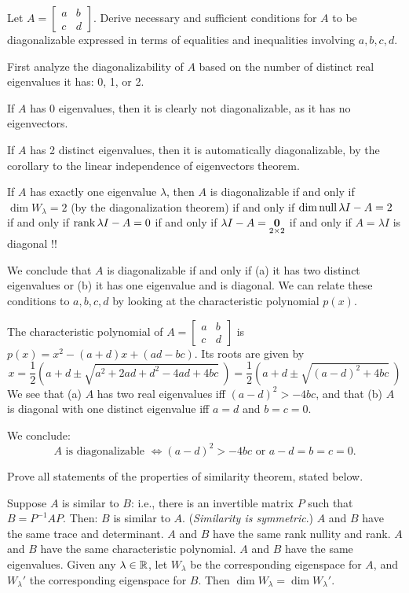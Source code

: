 \ii Let $A=\begin{bmatrix}
a&b\\ c&d
\end{bmatrix}$. Derive necessary and sufficient conditions for $A$ to be diagonalizable expressed in terms of equalities and inequalities involving $a,b,c,d$. 
\\
\begin{solution}
\noindent
First analyze the diagonalizability of $A$ based on the number of distinct real eigenvalues it has: 0, 1, or 2. 

\noindent
If $A$ has 0 eigenvalues, then it is clearly not diagonalizable, as it has no eigenvectors. 

\noindent
If $A$ has 2 distinct eigenvalues, then it is automatically diagonalizable, by the corollary to the linear independence of eigenvectors theorem. 

\noindent
If $A$ has exactly one eigenvalue $\lambda$, then $A$ is diagonalizable if and only if $\dim W_\lambda =2$ (by the diagonalization theorem) if and only if $\dim\operatorname{null} \lambda I -A=2$ if and only if $\operatorname{rank} \lambda I-A=0$ if and only if $\lambda I-A=\underset{2\times 2}{{\mathbf 0}}$ if and only if $A=\lambda I$ is diagonal !!

\noindent
We conclude that $A$ is diagonalizable if and only if (a) it has two distinct eigenvalues or (b) it has one eigenvalue and is diagonal. We can relate these conditions to $a,b,c,d$ by looking at the characteristic polynomial $p(x)$. 

\noindent
The characteristic polynomial of $A=\begin{bmatrix}
a&b\\ c&d
\end{bmatrix}$ is $p(x)=x^2-(a+d)x+(ad-bc)$. Its roots are given by 
\[
x=\frac{1}{2}(a+d\pm \sqrt{a^2+2ad+d^2-4ad+4bc}\ )=\frac{1}{2}(a+d\pm \sqrt{(a-d)^2+4bc}\ )
\]
We see that (a) $A$ has two real eigenvalues iff $(a-d)^2>-4bc$, and that (b) $A$ is diagonal with one distinct eigenvalue iff $a=d$ and $b=c=0$. 

\noindent
We conclude: 
\[
\text{$A$ is diagonalizable } \Longleftrightarrow (a-d)^2>-4bc\text{ or } a-d=b=c=0.
\]
\end{solution}
\ii Prove all statements of the properties of similarity theorem, stated below. 
\begin{namedtheorem}
 Suppose $A$ is similar to $B$: i.e., there is an invertible matrix $P$ such that $B=P^{-1}AP$. Then:
 \bb[(a)]
\ii $B$ is similar to $A$. ({\em Similarity is symmetric}.)
\ii $A$ and $B$ have the same trace and determinant. 
\ii $A$ and $B$ have the same rank nullity and rank. 
\ii $A$ and $B$ have the same characteristic polynomial.  
\ii $A$ and $B$ have the same eigenvalues. 
\ii Given any $\lambda\in{\mathbb R}$, let $W_\lambda$ be the corresponding eigenspace for $A$, and $W_\lambda'$ the corresponding eigenspace for $B$. Then $\dim W_{\lambda}=\dim W_{\lambda}'$. 
\ee
 \end{namedtheorem}
